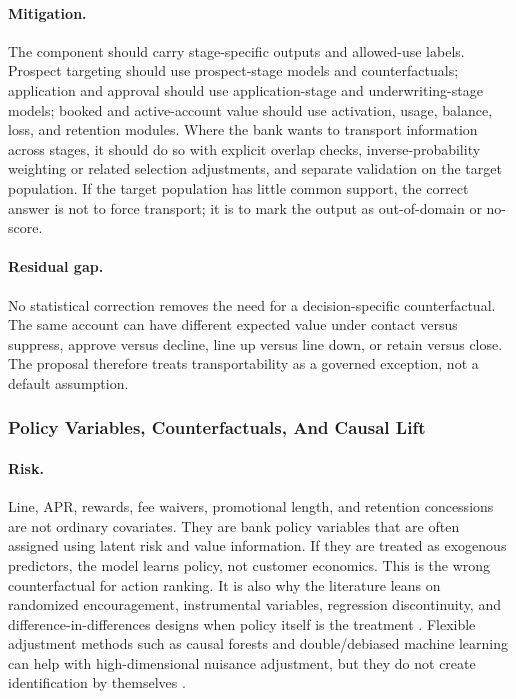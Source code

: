 \documentclass[11pt]{article}
\newcommand{\1}{\mathbf{1}}
\begin{document}
\paragraph{Mitigation.}
The component should carry stage-specific outputs and allowed-use labels.
Prospect targeting should use prospect-stage models and counterfactuals;
application and approval should use application-stage and underwriting-stage
models; booked and active-account value should use activation, usage, balance,
loss, and retention modules. Where the bank wants to transport information
across stages, it should do so with explicit overlap checks, inverse-probability
weighting or related selection adjustments, and separate validation on the
target population. If the target population has little common support, the
correct answer is not to force transport; it is to mark the output as
out-of-domain or no-score.

\paragraph{Residual gap.}
No statistical correction removes the need for a decision-specific
counterfactual. The same account can have different expected value under
contact versus suppress, approve versus decline, line up versus line down, or
retain versus close. The proposal therefore treats transportability as a
governed exception, not a default assumption.

\subsubsection{Policy Variables, Counterfactuals, And Causal Lift}

\paragraph{Risk.}
Line, APR, rewards, fee waivers, promotional length, and retention concessions
are not ordinary covariates. They are bank policy variables that are often
assigned using latent risk and value information. If they are treated as
exogenous predictors, the model learns policy, not customer economics. This is
the wrong counterfactual for action ranking. It is also why the literature
leans on randomized encouragement, instrumental variables, regression
discontinuity, and difference-in-differences designs when policy itself is
the treatment \citep{angristimbensrubin1996iv,lee2010rd,
callaway2021did,sun2021eventstudy}. Flexible adjustment methods such as
causal forests and double/debiased machine learning can help with
high-dimensional nuisance adjustment, but they do not create identification by
themselves \citep{wager2018causalforests,chernozhukov2018dml}.
\end{document}
